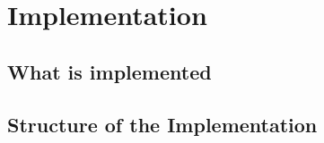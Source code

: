 
\chapter{Implementation}


\section{What is implemented}


\section{Structure of the Implementation}


